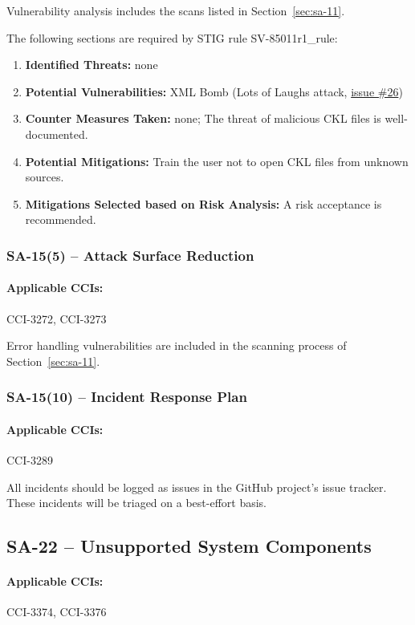\documentclass[letterpaper, 10pt, twoside]{article}
\begin{document}
Vulnerability analysis includes the scans listed in Section~\ref{sec:sa-11}.

The following sections are required by STIG rule SV-85011r1\_rule:
\begin{enumerate}
	\item \textbf{Identified Threats:} none
	\item \textbf{Potential Vulnerabilities:} XML Bomb (Lots of Laughs attack, \href{https://github.com/squinky86/STIGQter/issues/26}{issue \#26})
	\item \textbf{Counter Measures Taken:} none; The threat of malicious CKL files is well-documented.
	\item \textbf{Potential Mitigations:} Train the user not to open CKL files from unknown sources.
	\item \textbf{Mitigations Selected based on Risk Analysis:} A risk acceptance is recommended.
\end{enumerate}

\subsubsection{SA-15(5) -- Attack Surface Reduction}

\paragraph{Applicable CCIs:} CCI-3272, CCI-3273

Error handling vulnerabilities are included in the scanning process of Section~\ref{sec:sa-11}.

\subsubsection{SA-15(10) -- Incident Response Plan}

\paragraph{Applicable CCIs:} CCI-3289

All incidents should be logged as issues in the GitHub project's issue tracker. These incidents will be triaged on a best-effort basis.

\subsection{SA-22 -- Unsupported System Components}

\paragraph{Applicable CCIs:} CCI-3374, CCI-3376
\end{document}
